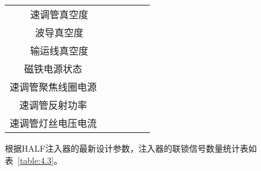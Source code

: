 \begin{table}[]
\begin{tabular}{|l|c|l|l|l|l|l|}
                                                                               & 速调管真空度  &                        &                        &                        &                             &                             \\ \cline{2-7} 
                                                                               & 波导真空度   &                        &                        &                        &                             &                             \\ \cline{2-7} 
                                                                               & 输运线真空度  &                        &                        &                        &                             &                             \\ \hline
\multicolumn{2}{|c|}{磁铁电源状态}                                                             &                        &                        &                        &                             &                             \\ \hline
\multicolumn{2}{|c|}{速调管聚焦线圈电源}                                                          &                        &                        &                        &                             &                             \\ \hline
\multicolumn{2}{|c|}{速调管反射功率}                                                            &                        &                        &                        &                             &                             \\ \hline
\multicolumn{2}{|c|}{速调管灯丝电压电流}                                                          &                        &                        &                        &                             &                             \\ \hline
\end{tabular}
\end{table}

根据HALF注入器的最新设计参数，注入器的联锁信号数量统计表如表~\ref{table:4.3}。

